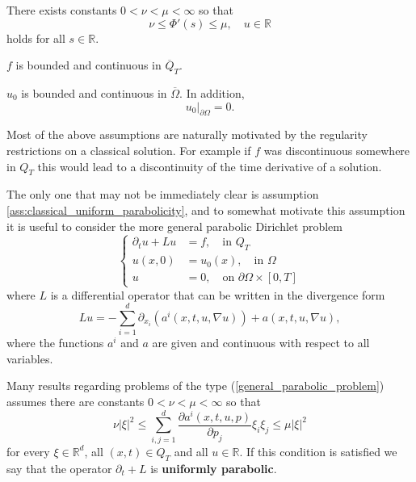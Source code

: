 \documentclass[11pt, a4paper]{article}
\begin{document}
\begin{assumption}
\label{ass:classical_uniform_parabolicity}
There exists constants $ 0 < \nu < \mu < \infty$ so that
\begin{equation}
\label{uniform_parabGPME}
\nu \leq \Phi'(s) \leq \mu, \quad u \in \mathbb{R}
\end{equation}
holds for all $s \in \mathbb{R}$.
\end{assumption}

\begin{assumption}[Continuity of $f$]
\label{ass:classical_f}
$f$ is bounded and continuous in $\overline{Q}_T$.
\end{assumption}

\begin{assumption}[Continuity of $u_0$]
\label{ass:classical_u_0}
$u_0$ is bounded and continuous in $\overline{\Omega}$. In addition, 
\begin{equation}
u_0\big|_{\partial \Omega} = 0.
\end{equation}
\end{assumption}

Most of the above assumptions are naturally motivated by the regularity restrictions on a classical solution. For example if $f$ was discontinuous somewhere in $Q_T$ this would lead to a discontinuity of the time derivative of a solution.

The only one that may not be immediately clear is assumption \ref{ass:classical_uniform_parabolicity}, and to somewhat motivate this assumption it is useful to consider the more general parabolic Dirichlet problem 
\begin{equation}
\label{general_parabolic_problem}
	\begin{cases}
		\partial_t u + Lu &= f, \quad \text{in } Q_T \\
		u(x,0) &= u_0(x), \quad \text{in } \Omega \\
		u &= 0, \quad \text{on } \partial \Omega \times [0,T]
	\end{cases}
\end{equation}
where $L$ is a differential operator that can be written in the divergence form
\begin{equation}
\label{divergence_operator}
Lu = -\sum_{i=1}^d \partial_{x_i}(a^i(x,t,u,\nabla u)) + a(x,t,u,\nabla u),
\end{equation}
where the functions $a^i$ and $a$ are given and continuous with respect to all variables.

Many results regarding problems of the type (\ref{general_parabolic_problem}) assumes there are constants $0 < \nu < \mu < \infty $ so that
\begin{equation}
\label{uniform_parabolicity}
\nu |\xi|^2 \leq \sum_{i,j=1}^d \frac{\partial a^i(x,t,u,p)}{\partial p_j}\xi_i \xi_j \leq \mu |\xi|^2 
\end{equation}
for every $\xi \in \mathbb{R}^d$, all $(x,t) \in Q_T$ and all $u\in \mathbb{R}$. If this condition is satisfied we say that the operator $\partial_t + L$ is \textbf{uniformly parabolic}.
\end{document}
